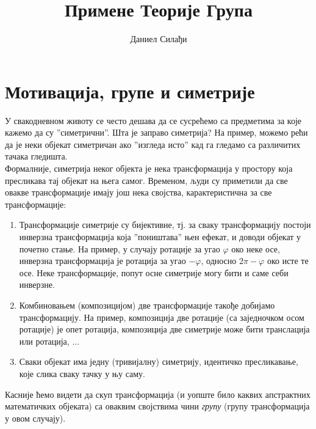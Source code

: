 \documentclass{report}
\theoremstyle{plain}
\theoremstyle{definition}
\begin{document}
\title{Примене Теорије Група}

\author{Даниел Силађи}

\maketitle

\tableofcontents

\chapter{Мотивација, групе и симетрије}
У свакодневном животу се често дешава да се сусрећемо са предметима за које
кажемо да су ''симетрични''. Шта је заправо симетрија? На пример, можемо рећи да је
неки објекат симетричан ако ''изгледа исто'' кад га гледамо са различитих тачака гледишта.\\
Формалније, симетрија неког објекта је нека трансформација у простору која пресликава
тај објекат на њега самог. Временом, људи су приметили да све овакве трансформације
имају још нека својства, карактеристична за све трансформације:
\begin{enumerate}
  \item Трансформације симетрије су бијективне, тј. за сваку трансформацију постоји инверзна трансформација која ''поништава'' њен ефекат, и доводи објекат у почетно стање. На пример, у случају ротације за угао $\varphi$ око неке осе, инверзна трансформација је ротација за угао $-\varphi$, односно $2\pi-\varphi$ око исте те осе. Неке трансформације, попут осне симетрије могу бити и саме себи инверзне.
  \item Комбиновањем (композицијом) две трансформације такође добијамо трансформацију. На пример, композиција две ротације (са заједночком осом ротације) је опет ротација, композиција две симетрије може бити транслација или ротација, ...
  \item Сваки објекат има једну (тривијалну) симетрију, идентичко пресликавање, које слика сваку тачку у њу саму.
\end{enumerate}
Касније ћемо видети да скуп трансформација (и уопште било каквих апстрактних математичких објеката) са оваквим својствима чини \emph{групу} (групу трансформација у овом случају).
\end{document}
